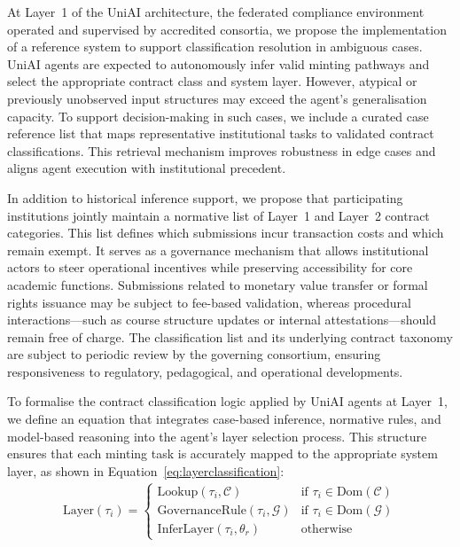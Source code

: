 \documentclass[oneside,10pt]{swissi}
\begin{document}
At Layer~1 of the UniAI architecture, the federated compliance environment operated and supervised by accredited consortia, we propose the implementation of a reference system to support classification resolution in ambiguous cases. UniAI agents are expected to autonomously infer valid minting pathways and select the appropriate contract class and system layer. However, atypical or previously unobserved input structures may exceed the agent’s generalisation capacity. To support decision-making in such cases, we include a curated case reference list that maps representative institutional tasks to validated contract classifications. This retrieval mechanism improves robustness in edge cases and aligns agent execution with institutional precedent.

In addition to historical inference support, we propose that participating institutions jointly maintain a normative list of Layer~1 and Layer~2 contract categories. This list defines which submissions incur transaction costs and which remain exempt. It serves as a governance mechanism that allows institutional actors to steer operational incentives while preserving accessibility for core academic functions. Submissions related to monetary value transfer or formal rights issuance may be subject to fee-based validation, whereas procedural interactions—such as course structure updates or internal attestations—should remain free of charge. The classification list and its underlying contract taxonomy are subject to periodic review by the governing consortium, ensuring responsiveness to regulatory, pedagogical, and operational developments.

To formalise the contract classification logic applied by UniAI agents at Layer~1, we define an equation that integrates case-based inference, normative rules, and model-based reasoning into the agent's layer selection process. This structure ensures that each minting task is accurately mapped to the appropriate system layer, as shown in Equation~\ref{eq:layerclassification}:
\begin{align}
\label{eq:layerclassification}
\text{Layer}(\tau_i) =
\begin{cases}
\text{Lookup}(\tau_i, \mathcal{C}) & \text{if } \tau_i \in \text{Dom}(\mathcal{C}) \\
\text{GovernanceRule}(\tau_i, \mathcal{G}) & \text{if } \tau_i \in \text{Dom}(\mathcal{G}) \\
\text{InferLayer}(\tau_i, \theta_r) & \text{otherwise}
\end{cases}
\end{align}
\end{document}
